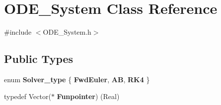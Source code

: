 \hypertarget{class_o_d_e___system}{}\section{O\+D\+E\+\_\+\+System Class Reference}
\label{class_o_d_e___system}


{\ttfamily \#include $<$O\+D\+E\+\_\+\+System.\+h$>$}

\subsection*{Public Types}
\begin{DoxyCompactItemize}
\item 
\mbox{\label{class_o_d_e___system_ac8345744d3861336748b03672bbcec08}} 
enum {\bfseries Solver\+\_\+type} \{ {\bfseries Fwd\+Euler}, 
{\bfseries AB}, 
{\bfseries R\+K4}
 \}
\item 
\mbox{\label{class_o_d_e___system_a9ff6775dafbba78d49f164174aa7074e}} 
typedef Vector($\ast$ {\bfseries Funpointer}) (Real)
\end{DoxyCompactItemize}
